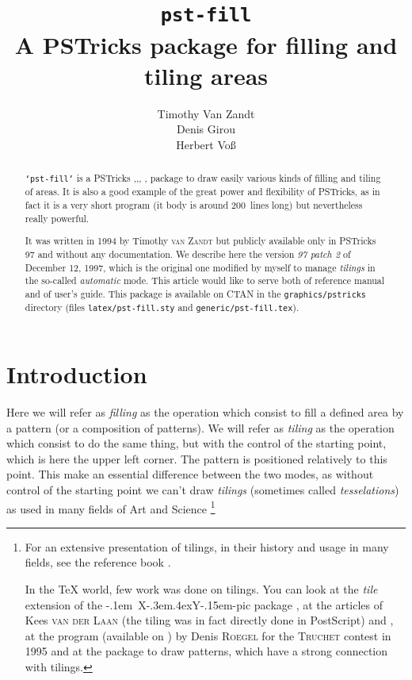 \documentclass[fontsize=11pt,english,BCOR=10mm,DIV=12,bibliography=totoc,parskip=false,
   headings=small, headinclude=false,footinclude=false,oneside]{pst-doc}
\title{\texttt{pst-fill}\\A PSTricks package for filling and tiling areas}
\author{Timothy Van Zandt\\Denis Girou\\ Herbert Voß}
\makeatletter
\newcommand\acro[1]{\textsc{#1}\@}
\def\CTAN{\acro{CTAN}}
\newcommand{\FillPackage}{\texttt{`pst-fill'}}
\newcommand{\XYpic}{%
  \leavevmode\hbox{\kern-.1em X\kern-.3em\lower.4ex\hbox{Y\kern-.15em}-pic}}
\makeatother
\begin{document}
\settitle
\tableofcontents
%
\begin{abstract}
 \FillPackage{} is a PSTricks \cite{vanZandt93},\cite{Girou94},\cite{vanZandtGirou94}, 
\cite{Hoenig97},\cite{LGC97} 
package to draw easily
 various kinds of filling and tiling of areas. It is also a good example of
 the great power and flexibility of PSTricks, as in fact it is a very short
 program (it body is around 200~lines long) but nevertheless really powerful.

 It was written in 1994 by Timothy \textsc{van Zandt} but
 publicly available only in PSTricks 97 and without any documentation.
 We describe here the version \emph{97 patch 2} of December 12, 1997, which
 is the original one modified by myself to manage \emph{tilings} in the
 so-called \emph{automatic} mode. This article would like to serve both of
 reference manual and of user's guide.
%
This package is available on \CTAN{} in the
 \texttt{graphics/pstricks} directory (files \texttt{latex/pst-fill.sty} and
 \texttt{generic/pst-fill.tex}).
\end{abstract}
%
\section{Introduction}

 Here we will refer as \emph{filling} as the operation which consist to fill
a defined area by a pattern (or a composition of patterns). We will refer as
\emph{tiling} as the operation which consist to do the same thing, but with
the control of the starting point, which is here the upper left corner.
The pattern is positioned relatively to this point. This make an essential
difference between the two modes, as without control of the starting point we
can't draw \emph{tilings} (sometimes  called \emph{tesselations}) as used in
many fields of Art and Science%
\footnote{For an extensive presentation of tilings, in their history and usage
in many fields, see the reference book \cite{GS87}.

In the \TeX{} world, few work was done on tilings. You can look at the
\emph{tile} extension of the \XYpic{} package \cite{XYpic}, at the articles of
Kees \textsc{van der Laan} \cite[paragraph 7]{LAAN96} (the tiling was in
fact directly done in PostScript) and \cite{LAAN97}, at the \MP{} program
(available on ) by Denis \textsc{Roegel} for the
\textsc{Truchet} contest in 1995 \cite{EsperetGirou98} and at the \MP{}
package \cite{Bolek98} to draw patterns, which have a strong connection with
tilings.}
\end{document}
